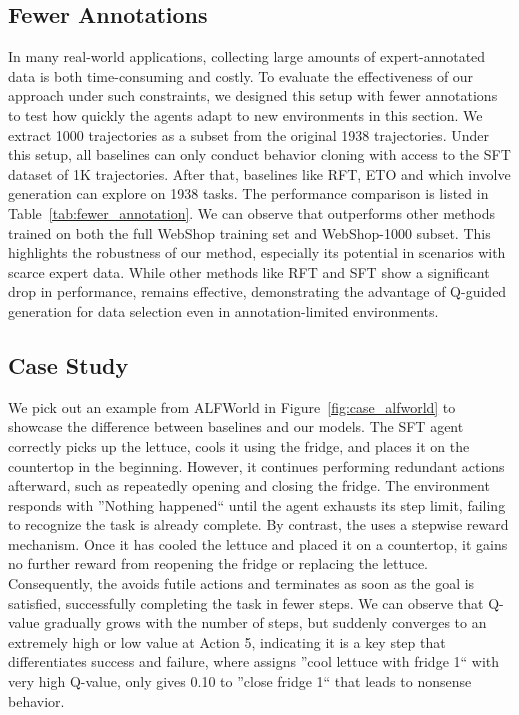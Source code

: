 \subsection{Fewer Annotations}


In many real-world applications, collecting large amounts of expert-annotated data is both time-consuming and costly. To evaluate the effectiveness of our approach under such constraints, we designed this setup with fewer annotations to test how quickly the agents adapt to new environments in this section.
We extract 1000 trajectories as a subset from the original 1938 trajectories. Under this setup, all baselines can only conduct behavior cloning with access to the SFT dataset of 1K trajectories. After that, baselines like RFT, ETO and {\ours} which involve generation can explore on 1938 tasks.
The performance comparison is listed in Table~\ref{tab:fewer_annotation}. We can observe that {\ours} outperforms other methods trained on both the full WebShop training set and WebShop-1000 subset. This highlights the robustness of our method, especially its potential in scenarios with scarce expert data. While other methods like RFT and SFT show a significant drop in performance, {\ours} remains effective, demonstrating the advantage of Q-guided generation for data selection even in annotation-limited environments.


\subsection{Case Study}

We pick out an example from ALFWorld in Figure~\ref{fig:case_alfworld} to showcase the difference between baselines and our models.
The SFT agent correctly picks up the lettuce, cools it using the fridge, and places it on the countertop in the beginning. However, it continues performing redundant actions afterward, such as repeatedly opening and closing the fridge. The environment responds with ''Nothing happened`` until the agent exhausts its step limit, failing to recognize the task is already complete.
By contrast, the \ours{} uses a stepwise reward mechanism. Once it has cooled the lettuce and placed it on a countertop, it gains no further reward from reopening the fridge or replacing the lettuce. Consequently, the {\ours} avoids futile actions and terminates as soon as the goal is satisfied, successfully completing the task in fewer steps. We can observe that Q-value gradually grows with the number of steps, but suddenly converges to an extremely high or low value at Action 5, indicating it is a key step that differentiates success and failure, where {\ours} assigns ''cool lettuce with fridge 1`` with very high Q-value, only gives 0.10 to ''close fridge 1`` that leads to nonsense behavior. 

